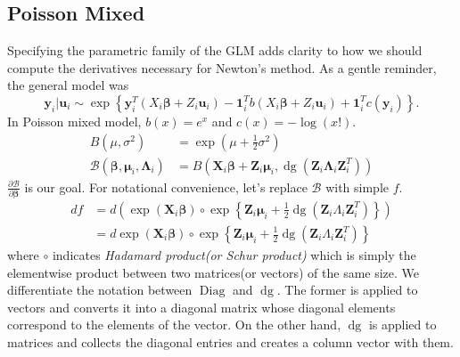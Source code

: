 \documentclass[11pt]{article}
\newcommand{\bs}{\boldsymbol}
\newcommand{\opn}{\operatorname}
\begin{document}
\subsection{Poisson Mixed}
Specifying the parametric family of the GLM adds clarity to how we should compute the derivatives necessary for Newton's method. As a gentle reminder, the general model was
$$
  \bs{y}_{i}|\bs{u}_{i} \sim \exp\left\{\bs{y}_{i}^{T}\left(X_{i}\bs{\beta} + Z_{i}\bs{u}_{i} \right) - \bs{1}_{i}^{T}b\left(X_{i}\bs{\beta} + Z_{i}\bs{u}_{i} \right)+\bs{1}_{i}^{T}c(\bs{y}_{i}) \right\} .
$$
In Poisson mixed model, $b(x) = e^{x}$ and $c(x) = -\log \left(x! \right)$.
\begin{align*}
  B(\mu, \sigma^{2}) &= \exp \left(\mu + \frac{1}{2}\sigma^{2} \right)\\
  \mathcal{B}\left(\bs{\beta}, \bs{\mu}_{i}, \bs{\Lambda}_{i} \right) &= B\left(\bs{X}_{i}\bs{\beta} + \bs{Z}_{i}\bs{\mu}_{i}, \opn{dg}\left(\bs{Z}_{i}\bs{\Lambda}_{i}\bs{Z}_{i}^{T} \right) \right)
\end{align*}
$\frac{\partial \mathcal{B}}{\partial \bs{\beta}}$ is our goal. For notational convenience, let's replace $\mathcal{B}$ with simple $f$.
\begin{align*}
  df &= d \left(\exp \left(\bs{X}_{i}\bs{\beta} \right) \circ \exp \left\{\bs{Z}_{i}\bs{\mu}_{i} + \frac{1}{2}\opn{dg}\left(\bs{Z}_{i}\Lambda_{i}\bs{Z}_{i}^{T} \right) \right\}\right)\\
  &= d\exp \left(\bs{X}_{i}\bs{\beta} \right) \circ \exp \left\{\bs{Z}_{i}\bs{\mu}_{i} + \frac{1}{2}\opn{dg}\left(\bs{Z}_{i}\Lambda_{i}\bs{Z}_{i}^{T} \right) \right\}
\end{align*}
where $\circ$ indicates \emph{Hadamard product(or Schur product)} which is simply the elementwise product between two matrices(or vectors) of the same size. We differentiate the notation between \textcolor{myblue}{$\opn{Diag}$} and \textcolor{myorange}{$\opn{dg}$}. The former is applied to \textcolor{myblue}{vectors} and converts it into a diagonal matrix whose diagonal elements correspond to the elements of the vector. On the other hand, $\opn{dg}$ is applied to \textcolor{myorange}{matrices} and collects the diagonal entries and creates a column vector with them.
\end{document}
